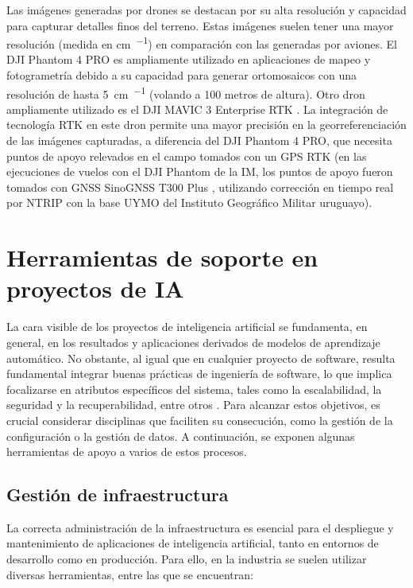 Las imágenes generadas por drones se destacan por su alta resolución y capacidad para capturar detalles finos del terreno. Estas imágenes suelen tener una mayor resolución (medida en \si{\centi\meter\per\pixel}) en comparación con las generadas por aviones. El DJI Phantom 4 PRO \citep{dji_support_nodate} es ampliamente utilizado en aplicaciones de mapeo y fotogrametría debido a su capacidad para generar ortomosaicos con una resolución de hasta \SI{5}{\centi\meter\per\pixel} (volando a 100 metros de altura). Otro dron ampliamente utilizado es el DJI MAVIC 3 Enterprise RTK \citep{dji_specs_nodate}. La integración de tecnología RTK \citep{wikipedia_rtk_2024} en este dron permite una mayor precisión en la georreferenciación de las imágenes capturadas, a diferencia del DJI Phantom 4 PRO, que necesita puntos de apoyo relevados en el campo tomados con un GPS RTK (en las ejecuciones de vuelos con el DJI Phantom de la IM, los puntos de apoyo fueron tomados con GNSS SinoGNSS T300 Plus \citep{comnav_technology_ltd_receptor_nodate}, utilizando corrección en tiempo real por NTRIP \citep{wikipedia_networked_2025} con la base UYMO del Instituto Geográfico Militar uruguayo).

\section{Herramientas de soporte en proyectos de IA}
\label{sec:herramSopIA}

La cara visible de los proyectos de inteligencia artificial se fundamenta, en general, en los resultados y aplicaciones derivados de modelos de aprendizaje automático. No obstante, al igual que en cualquier proyecto de software, resulta fundamental integrar buenas prácticas de ingeniería de software, lo que implica focalizarse en atributos específicos del sistema, tales como la escalabilidad, la seguridad y la recuperabilidad, entre otros \citep{sommerville_software_2015}. Para alcanzar estos objetivos, es crucial considerar disciplinas que faciliten su consecución, como la gestión de la configuración o la gestión de datos. A continuación, se exponen algunas herramientas de apoyo a varios de estos procesos.

\subsection{Gestión de infraestructura}
\label{sec:gestionDeinfraestructura}

La correcta administración de la infraestructura es esencial para el despliegue y mantenimiento de aplicaciones de inteligencia artificial, tanto en entornos de desarrollo como en producción. Para ello, en la industria se suelen utilizar diversas herramientas, entre las que se encuentran:

